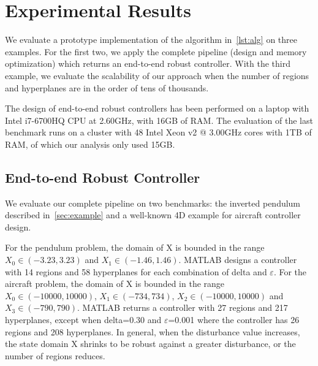 \section{Experimental Results}



We evaluate a prototype implementation of the algorithm in~\autoref{lst:alg}
on three examples. For the first two, we apply the complete pipeline (design and memory optimization)
which returns an end-to-end robust controller. With the third example, we evaluate
the scalability of our approach when the number of regions and hyperplanes are in
the order of tens of thousands.


The design of end-to-end robust controllers has been performed on a laptop with Intel i7-6700HQ CPU at
2.60GHz, with 16GB of RAM. The evaluation of the last benchmark runs on a
cluster with 48 Intel Xeon v2 @ 3.00GHz cores with 1TB of RAM, of which our analysis
only used 15GB.

\subsection{End-to-end Robust Controller}

We evaluate our complete pipeline on two benchmarks: the inverted pendulum
described in~\autoref{sec:example} and a well-known 4D example for aircraft
controller design.

For the pendulum problem, the domain of X is bounded in the range $X_{0} \in
(-3.23, 3.23)$ and $X_{1}\in (-1.46, 1.46)$. MATLAB designs a controller with 14
regions and 58 hyperplanes for each combination of delta and $\varepsilon$.
For the aircraft problem, the domain of X is bounded in the range $X_{0} \in
(-10000, 10000)$, $X_{1}\in (-734, 734)$, $X_{2}\in (-10000, 10000)$ and
$X_{3}\in (-790, 790)$. MATLAB returns a controller with 27 regions and 217
hyperplanes, except when delta=0.30 and $\varepsilon$=0.001 where the controller
has 26 regions and 208 hyperplanes. In general, when the disturbance value
increases, the state domain X shrinks to be robust against a greater
disturbance, or the number of regions reduces.


